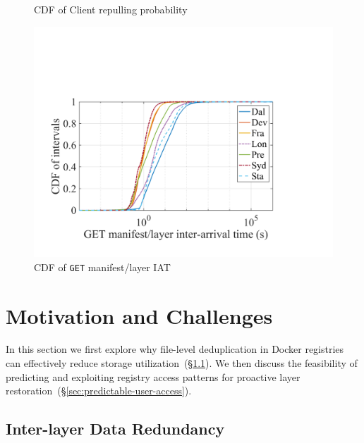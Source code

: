 \begin{figure}[t]
\begin{minipage}{0.265\textwidth}
                \caption{CDF of Client repulling probability}%
                \label{fig:client-repull-cdf}
        \end{minipage}%
\hspace{1mm}
        \begin{minipage}{0.27\textwidth}
        \centering
        \includegraphics[width=\textwidth]{graphs/GML-intervals.pdf}
        \caption{CDF of \texttt{GET} manifest/layer IAT}
        \label{fig:intervals}
        \end{minipage}
\end{figure}



\section{Motivation and Challenges}
\label{sec:dataset-analysis}

In this section we first explore why file-level deduplication in Docker
registries can effectively reduce storage
utilization~(\S\ref{sec:inter-layer-deduplication}).
%
We then discuss the feasibility of predicting and exploiting registry access
patterns for proactive layer restoration~(\S\ref{sec:predictable-user-access}).

\subsection{Inter-layer Data Redundancy}
\label{sec:inter-layer-deduplication}

